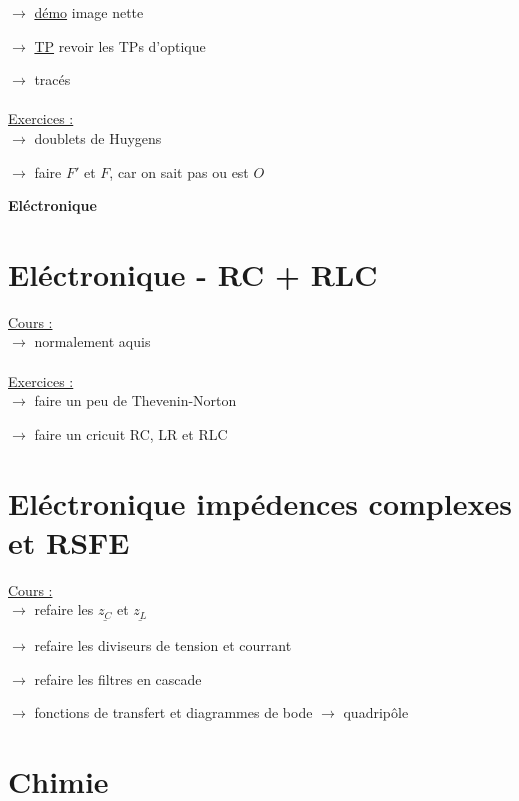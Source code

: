\documentclass{book}
\begin{document}
$\rightarrow$ \underline{démo} image nette

$\rightarrow$ \underline{TP} revoir les TPs d'optique

$\rightarrow$ tracés \\ \\
\underline{\Large{Exercices :}} \\

$\rightarrow$ doublets de Huygens

\hspace{1cm}$\rightarrow$ faire $F'$ et $F$, car on sait pas ou est $O$




\begin{center}
\textbf{\large Eléctronique}
\end{center} \vspace{0.2cm}



\section{Eléctronique - RC + RLC}

\underline{\Large{Cours :}} \\

$\rightarrow$ normalement aquis \\ \\
\underline{\Large{Exercices :}} \\

$\rightarrow$ faire un peu de Thevenin-Norton

$\rightarrow$ faire un cricuit RC, LR et RLC \\



\section{Eléctronique impédences complexes et RSFE}

\underline{\Large{Cours :}} \\

$\rightarrow$ refaire les $\underline{z_C}$ et $\underline{z_L}$

$\rightarrow$ refaire les diviseurs de tension et courrant

$\rightarrow$ refaire les filtres en cascade

$\rightarrow$ fonctions de transfert et diagrammes de bode
$\rightarrow$ quadripôle


\section{Chimie}
\end{document}
